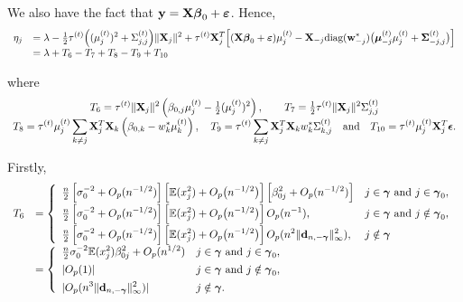 \documentclass[11pt]{article}
\newtheorem{Main Result}{Main Result}
\def\vectorfontone{\bf}
\def\vectorfonttwo{\boldsymbol}
\def\vd{{\vectorfontone d}}                      %
\def\vw{{\vectorfontone w}}                      %
\def\vy{{\vectorfontone y}}                      %
\def\vbeta{{\vectorfonttwo \beta}}               %
\def\vgamma{{\vectorfonttwo \gamma}}             %
\def\vepsilon{{\vectorfonttwo \epsilon}}         %
\def\vvarepsilon{{\vectorfonttwo \varepsilon}}   %
\def\vmu{{\vectorfonttwo \mu}}                   %
\def\matrixfontone{\bf}
\def\matrixfonttwo{\boldsymbol}
\def\mX{{\matrixfontone X}}                      %
\def\mSigma{{\matrixfonttwo \Sigma}}             %
\def\bE{{\mathbb E}}                             %
\def\ds{\displaystyle}
\def\diag{\text{diag}}
\begin{document}
{\noindent We also have the fact that
$\vy = \mX\vbeta_0 + \vvarepsilon$.
Hence,
$$
\begin{array}{rl}
\ds \eta_j
& \ds =
\lambda
- \tfrac{1}{2}\tau^{(t)}\Big( (\mu_j^{(t)})^2 + \Sigma_{j,j}^{(t)}\Big)\|\mX_j\|^2
+ \tau^{(t)}\mX_j^T\Big[(\mX\vbeta_0 + \vvarepsilon)\mu_j^{(t)} - \mX_{-j}\diag(\vw_{-j}^{*})
\big(\vmu_{-j}^{(t)}\mu_j^{(t)}  + \mSigma_{-j,j}^{(t)}\big)\Big]
\\
& \ds = \lambda + T_6  - T_7 + T_8 - T_9 +T_{10}
\end{array}
$$

\noindent where
$$
\begin{array}{c}
\ds T_6 = \tau^{(t)}   \|\mX_j\|^2 \left( \beta_{0,j}\mu_j^{(t)}   - \tfrac{1}{2}(\mu_j^{(t)})^2 \right),
\qquad
\ds T_7 =  \tfrac{1}{2}\tau^{(t)}    \|\mX_j\|^2 \Sigma_{j,j}^{(t)}
\\
\ds T_8 = \tau^{(t)}   \mu_j^{(t)}   \sum_{k\ne j}  \mX_j^T\mX_k\left( \beta_{0,k} - w_k^{*} \mu_k^{(t)}   \right),\quad
T_9 = \tau^{(t)}  \sum_{k\ne j} \mX_j^T\mX_k w_k^{*}\Sigma_{k,j}^{(t)} \quad
\mbox{and} \quad
T_{10} = \tau^{(t)}   \mu_j^{(t)} \mX_j^T\vepsilon.

\end{array}
$$

\noindent Firstly,
$$
\begin{array}{rl}
\ds T_6
& \ds = \left\{ \begin{array}{ll}
\ds \tfrac{n}{2}\left[\sigma^{-2}_0 + O_p(n^{-1/2})  \right]
\left[ \bE(x_j^2) + O_p\big(n^{-1/2}\big)\right] \left[\beta_{0j}^2 + O_p(n^{-1/2}) \right]
&  \mbox{$j\in \vgamma$ and $j\in\vgamma_0$},
\\ [1ex]
\ds \tfrac{n}{2}\left[\sigma^{-2}_0 + O_p(n^{-1/2}) \right]\left[\bE (x_j^2)+O_p\big(n^{-1/2}\big)\right]O_p(n^{-1}),
&  \mbox{$j\in \vgamma$ and $j\notin\vgamma_0$},
\\ [1ex]
\ds \tfrac{n}{2}\left[\sigma^{-2}_0 + O_p(n^{-1/2})  \right]\left[\bE (x_j^2)+O_p\big(n^{-1/2}\big)\right]O_p(n^2\|\vd_{n,-\vgamma}\|_\infty^2),
&  \mbox{$j\notin \vgamma$}
\end{array} \right.
\\ [1ex]
& \ds = \left\{ \begin{array}{ll}
\ds \tfrac{n}{2} \sigma^{-2}_0  \bE(x_j^2)\beta_{0j}^2
+ O_p(n^{1/2})
&  \mbox{$j\in \vgamma$ and $j\in\vgamma_0$},\\ [1ex]
\ds |O_p(1)|
&  \mbox{$j\in \vgamma$ and $j\notin\vgamma_0$}, \\ [1ex]
\ds |O_p(n^3\|\vd_{n,-\vgamma}\|_\infty^2)|
&  \mbox{$j\notin \vgamma$}.
\end{array} \right.
\end{array}
$$

}
\end{document}
